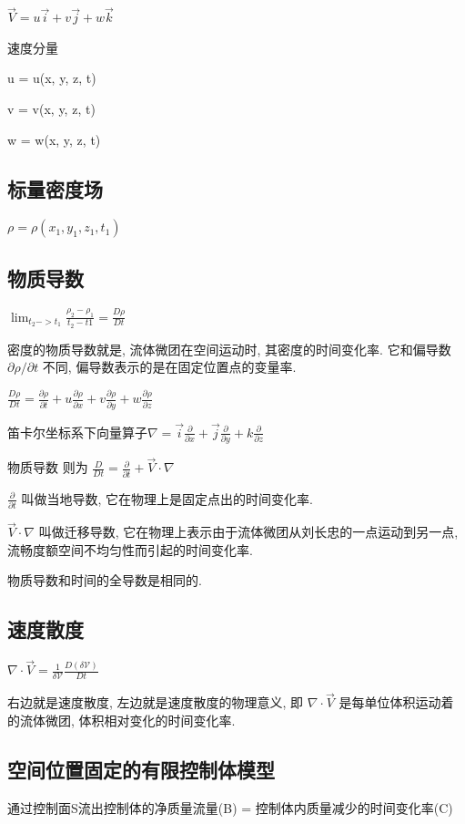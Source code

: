 $\vec{V} = u\vec{i} + v\vec{j} + w\vec{k}$

速度分量

u = u(x, y, z, t)

v = v(x, y, z, t)

w = w(x, y, z, t)

\subsection{标量密度场}

$\rho = \rho (x_1, y_1, z_1, t_1)$

\subsection{物质导数}

$\lim _{t_2 -> t_1} \frac{\rho_2 - \rho_1}{t_2 - t1} = \frac{D\rho}{Dt}$

密度的物质导数就是, 流体微团在空间运动时, 其密度的时间变化率.  它和偏导数$\partial \rho / \partial t$ 不同, 偏导数表示的是在固定位置点的变量率.

$\frac{D\rho}{Dt} = \frac{\partial \rho}{\partial t} + u \frac{\partial \rho}{\partial x} + v \frac{\partial \rho}{\partial y} + w \frac{\partial \rho}{\partial z}$

笛卡尔坐标系下向量算子$\nabla = \vec{i} \frac{\partial}{\partial x} + \vec{j} \frac{\partial}{\partial y} + k \frac{\partial}{ \partial z}$

物质导数 则为 $\frac{D}{Dt} = \frac{\partial}{\partial t} + \vec{V} \cdot \nabla$

$\frac{\partial}{\partial t}$ 叫做当地导数, 它在物理上是固定点出的时间变化率.

$\vec{V} \cdot \nabla$ 叫做迁移导数, 它在物理上表示由于流体微团从刘长忠的一点运动到另一点, 流畅度额空间不均匀性而引起的时间变化率.

物质导数和时间的全导数是相同的.

\subsection{速度散度}

$\nabla \cdot \vec{V} = \frac{1}{\delta \mathcal{V} } \frac{D(\delta \mathcal{V})}{Dt}$

右边就是速度散度, 左边就是速度散度的物理意义, 即 $\nabla \cdot \vec{V}$ 是每单位体积运动着的流体微团, 体积相对变化的时间变化率.

\subsection{空间位置固定的有限控制体模型}
通过控制面S流出控制体的净质量流量(B) = 控制体内质量减少的时间变化率(C)

